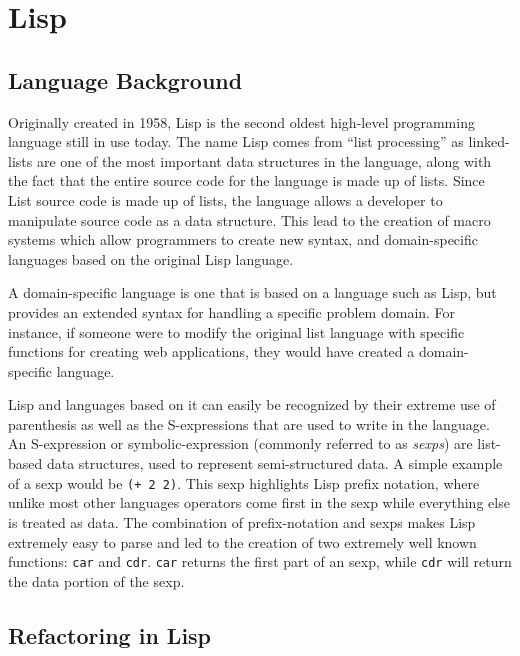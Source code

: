 \documentclass{article}
\begin{document}

\section{Lisp}

\subsection{Language Background}

Originally created in 1958, Lisp is the second oldest high-level programming language still in use today. The name Lisp comes from ``list processing'' as linked-lists are one of the most important data structures in the language, along with the fact that the entire source code for the language is made up of lists. Since List source code is made up of lists, the language allows a developer to manipulate source code as a data structure. This lead to the creation of macro systems which allow programmers to create new syntax, and domain-specific languages based on the original Lisp language.

A domain-specific language is one that is based on a language such as Lisp, but provides an extended syntax for handling a specific problem domain. For instance, if someone were to modify the original list language with specific functions for creating web applications, they would have created a domain-specific language.

Lisp and languages based on it can easily be recognized by their extreme use of parenthesis as well as the S-expressions that are used to write in the language. An S-expression or symbolic-expression (commonly referred to as \textit{sexps}) are list-based data structures, used to represent semi-structured data. A simple example of a sexp would be \verb!(+ 2 2)!. This sexp highlights Lisp prefix notation, where unlike most other languages operators come first in the sexp while everything else is treated as data. The combination of prefix-notation and sexps makes Lisp extremely easy to parse and led to the creation of two extremely well known functions: \verb!car! and \verb!cdr!. \verb!car! returns the first part of an sexp, while \verb!cdr! will return the data portion of the sexp.


\subsection{Refactoring in Lisp}
\end{document}
